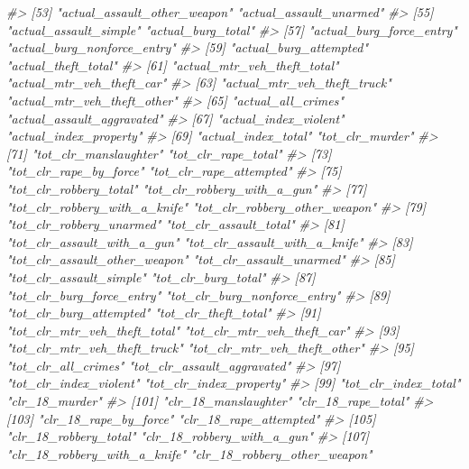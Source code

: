 \documentclass[
  12pt,
]{book}
\newenvironment{Shaded}{\begin{snugshade}}{\end{snugshade}}
\newcommand{\CommentTok}[1]{\textcolor[rgb]{0.37,0.37,0.37}{\textit{#1}}}
\begin{document}
\begin{Shaded}
\begin{Highlighting}[]
\CommentTok{\#>  [53] "actual\_assault\_other\_weapon"    "actual\_assault\_unarmed"        }
\CommentTok{\#>  [55] "actual\_assault\_simple"          "actual\_burg\_total"             }
\CommentTok{\#>  [57] "actual\_burg\_force\_entry"        "actual\_burg\_nonforce\_entry"    }
\CommentTok{\#>  [59] "actual\_burg\_attempted"          "actual\_theft\_total"            }
\CommentTok{\#>  [61] "actual\_mtr\_veh\_theft\_total"     "actual\_mtr\_veh\_theft\_car"      }
\CommentTok{\#>  [63] "actual\_mtr\_veh\_theft\_truck"     "actual\_mtr\_veh\_theft\_other"    }
\CommentTok{\#>  [65] "actual\_all\_crimes"              "actual\_assault\_aggravated"     }
\CommentTok{\#>  [67] "actual\_index\_violent"           "actual\_index\_property"         }
\CommentTok{\#>  [69] "actual\_index\_total"             "tot\_clr\_murder"                }
\CommentTok{\#>  [71] "tot\_clr\_manslaughter"           "tot\_clr\_rape\_total"            }
\CommentTok{\#>  [73] "tot\_clr\_rape\_by\_force"          "tot\_clr\_rape\_attempted"        }
\CommentTok{\#>  [75] "tot\_clr\_robbery\_total"          "tot\_clr\_robbery\_with\_a\_gun"    }
\CommentTok{\#>  [77] "tot\_clr\_robbery\_with\_a\_knife"   "tot\_clr\_robbery\_other\_weapon"  }
\CommentTok{\#>  [79] "tot\_clr\_robbery\_unarmed"        "tot\_clr\_assault\_total"         }
\CommentTok{\#>  [81] "tot\_clr\_assault\_with\_a\_gun"     "tot\_clr\_assault\_with\_a\_knife"  }
\CommentTok{\#>  [83] "tot\_clr\_assault\_other\_weapon"   "tot\_clr\_assault\_unarmed"       }
\CommentTok{\#>  [85] "tot\_clr\_assault\_simple"         "tot\_clr\_burg\_total"            }
\CommentTok{\#>  [87] "tot\_clr\_burg\_force\_entry"       "tot\_clr\_burg\_nonforce\_entry"   }
\CommentTok{\#>  [89] "tot\_clr\_burg\_attempted"         "tot\_clr\_theft\_total"           }
\CommentTok{\#>  [91] "tot\_clr\_mtr\_veh\_theft\_total"    "tot\_clr\_mtr\_veh\_theft\_car"     }
\CommentTok{\#>  [93] "tot\_clr\_mtr\_veh\_theft\_truck"    "tot\_clr\_mtr\_veh\_theft\_other"   }
\CommentTok{\#>  [95] "tot\_clr\_all\_crimes"             "tot\_clr\_assault\_aggravated"    }
\CommentTok{\#>  [97] "tot\_clr\_index\_violent"          "tot\_clr\_index\_property"        }
\CommentTok{\#>  [99] "tot\_clr\_index\_total"            "clr\_18\_murder"                 }
\CommentTok{\#> [101] "clr\_18\_manslaughter"            "clr\_18\_rape\_total"             }
\CommentTok{\#> [103] "clr\_18\_rape\_by\_force"           "clr\_18\_rape\_attempted"         }
\CommentTok{\#> [105] "clr\_18\_robbery\_total"           "clr\_18\_robbery\_with\_a\_gun"     }
\CommentTok{\#> [107] "clr\_18\_robbery\_with\_a\_knife"    "clr\_18\_robbery\_other\_weapon"   }

\end{Highlighting}
\end{Shaded}
\end{document}
